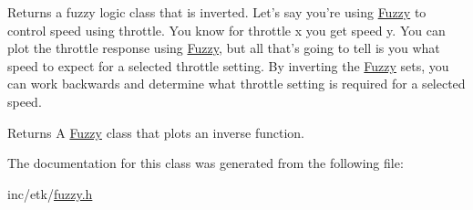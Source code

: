 Returns a fuzzy logic class that is inverted. Let's say you're using \hyperlink{classetk_1_1_fuzzy}{Fuzzy} to control speed using throttle. You know for throttle x you get speed y. You can plot the throttle response using \hyperlink{classetk_1_1_fuzzy}{Fuzzy}, but all that's going to tell is you what speed to expect for a selected throttle setting. By inverting the \hyperlink{classetk_1_1_fuzzy}{Fuzzy} sets, you can work backwards and determine what throttle setting is required for a selected speed. 

\begin{DoxyReturn}{Returns}
A \hyperlink{classetk_1_1_fuzzy}{Fuzzy} class that plots an inverse function. 
\end{DoxyReturn}


The documentation for this class was generated from the following file\-:\begin{DoxyCompactItemize}
\item 
inc/etk/\hyperlink{fuzzy_8h}{fuzzy.\-h}\end{DoxyCompactItemize}
